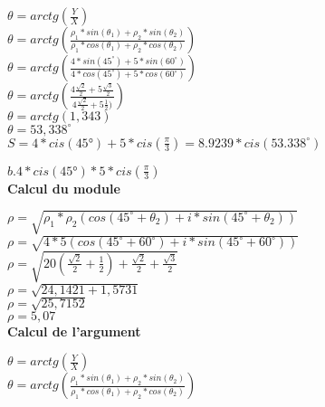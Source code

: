 $\theta = arctg(\frac{Y}{X})$ \\

$\theta = arctg(\frac{\rho_1 * sin(\theta_1) + \rho_2 * sin(\theta_2)} {\rho_1 * cos(\theta_1) + \rho_2 * cos(\theta_2)})$ \\

$\theta = arctg(\frac{4 * sin(45^{\circ}) + 5 * sin(60^{\circ})} {4 * cos(45^{\circ}) + 5 * cos(60^{\circ})})$ \\

$\theta = arctg(\frac{4\frac{\sqrt{2}} {2} + 5\frac{\sqrt{3}} {2}} {4\frac{\sqrt{2}} {2} + 5\frac{1} {2})})$ \\

$\theta = arctg(1,343)$ \\

$\theta = 53,338^{\circ}$ \\

$ S = 4*cis(45°) + 5*cis(\frac{\pi}{3}) = 8.9239 * cis(53.338^{\circ})$

\newpage

$b. 4*cis(45°) * 5*cis(\frac{\pi}{3})$ \\

\textbf{Calcul du module} \\
\vspace{3mm} %

$\rho = \sqrt{\rho_1*\rho_2 (cos(45^{\circ} + \theta_2)+ i* sin(45^{\circ}+ \theta_2)) }$ \\

$\rho = \sqrt{4*5 (cos(45^{\circ} + 60^{\circ})+ i* sin(45^{\circ}+ 60^{\circ})) }$ \\

$\rho = \sqrt{20  (\frac{\sqrt{2}}{2} + \frac{1}{2}) + \frac{\sqrt{2}} {2} + \frac{\sqrt{3}} {2} }$\\

$\rho = \sqrt{24,1421 + 1,5731 }$\\

$\rho = \sqrt{25,7152}$\\

$\rho = 5,07$\\

\textbf{Calcul de l'argument} \\
\vspace{3mm} %

$\theta = arctg(\frac{Y}{X})$\\

$\theta = arctg(\frac{\rho_1 * sin(\theta_1) + \rho_2 * sin(\theta_2)} {\rho_1 * cos(\theta_1) + \rho_2 * cos(\theta_2)})$ \\

